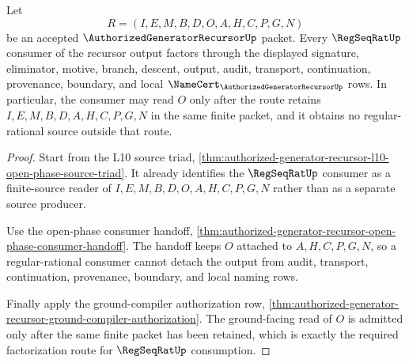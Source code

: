 \begin{theorem}
\label{thm:authorized-generator-recursor-regseqrat-route-factorization}
Let
$$
R=(I,E,M,B,D,O,A,H,C,P,G,N)
$$
be an accepted $\AuthorizedGeneratorRecursorUp$ packet. Every $\RegSeqRatUp$ consumer of the recursor output factors through the displayed signature, eliminator, motive, branch, descent, output, audit, transport, continuation, provenance, boundary, and local $\NameCert_{\AuthorizedGeneratorRecursorUp}$ rows. In particular, the consumer may read $O$ only after the route retains $I,E,M,B,D,A,H,C,P,G,N$ in the same finite packet, and it obtains no regular-rational source outside that route.
\end{theorem}
\begin{proof}
Start from the L10 source triad, \autoref{thm:authorized-generator-recursor-l10-open-phase-source-triad}. It already identifies the $\RegSeqRatUp$ consumer as a finite-source reader of $I,E,M,B,D,O,A,H,C,P,G,N$ rather than as a separate source producer.

Use the open-phase consumer handoff, \autoref{thm:authorized-generator-recursor-open-phase-consumer-handoff}. The handoff keeps $O$ attached to $A,H,C,P,G,N$, so a regular-rational consumer cannot detach the output from audit, transport, continuation, provenance, boundary, and local naming rows.

Finally apply the ground-compiler authorization row, \autoref{thm:authorized-generator-recursor-ground-compiler-authorization}. The ground-facing read of $O$ is admitted only after the same finite packet has been retained, which is exactly the required factorization route for $\RegSeqRatUp$ consumption.
\end{proof}

